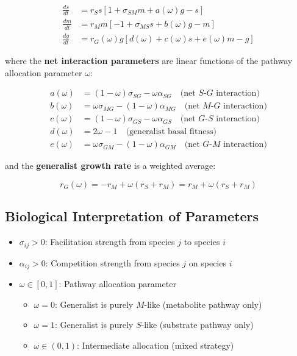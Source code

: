 \documentclass[11pt]{article}
\begin{document}
\begin{align}
\frac{ds}{dt} &= r_S s \left[1 + \sigma_{SM} m + a(\omega) g - s\right] \label{eq:ds} \\
\frac{dm}{dt} &= r_M m \left[-1 + \sigma_{MS} s + b(\omega) g - m\right] \label{eq:dm} \\
\frac{dg}{dt} &= r_G(\omega) g \left[d(\omega) + c(\omega) s + e(\omega) m - g\right] \label{eq:dg}
\end{align}

where the \textbf{net interaction parameters} are linear functions of the pathway allocation parameter $\omega$:

\begin{align}
a(\omega) &= (1-\omega)\sigma_{SG} - \omega\alpha_{SG} \quad \text{(net $S$-$G$ interaction)} \label{eq:a}\\
b(\omega) &= \omega\sigma_{MG} - (1-\omega)\alpha_{MG} \quad \text{(net $M$-$G$ interaction)} \label{eq:b}\\
c(\omega) &= (1-\omega)\sigma_{GS} - \omega\alpha_{GS} \quad \text{(net $G$-$S$ interaction)} \label{eq:c}\\
d(\omega) &= 2\omega - 1 \quad \text{(generalist basal fitness)} \label{eq:d}\\
e(\omega) &= \omega\sigma_{GM} - (1-\omega)\alpha_{GM} \quad \text{(net $G$-$M$ interaction)} \label{eq:e}
\end{align}

and the \textbf{generalist growth rate} is a weighted average:

\begin{equation}
r_G(\omega) = -r_M + \omega(r_S + r_M) = r_M + \omega(r_S + r_M) \label{eq:rG}
\end{equation}

\subsection{Biological Interpretation of Parameters}

\begin{itemize}
    \item $\sigma_{ij} > 0$: Facilitation strength from species $j$ to species $i$
    \item $\alpha_{ij} > 0$: Competition strength from species $j$ on species $i$
    \item $\omega \in [0,1]$: Pathway allocation parameter
    \begin{itemize}
        \item $\omega = 0$: Generalist is purely $M$-like (metabolite pathway only)
        \item $\omega = 1$: Generalist is purely $S$-like (substrate pathway only)
        \item $\omega \in (0,1)$: Intermediate allocation (mixed strategy)
    \end{itemize}
\end{itemize}
\end{document}
